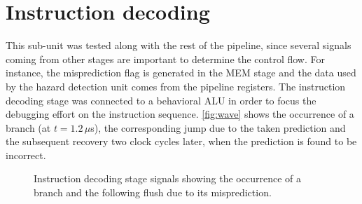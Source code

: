 \section{Instruction decoding}
This sub-unit was tested along with the rest of the pipeline, since several signals coming from other stages are important to determine the control flow. For instance, the misprediction flag is generated in the MEM stage and the data used by the hazard detection unit comes from the pipeline registers. The instruction decoding stage was connected to a behavioral ALU in order to focus the debugging effort on the instruction sequence. \autoref{fig:wave} shows the occurrence of a branch (at $t=1.2\, \mu$s), the corresponding jump due to the taken prediction and the subsequent recovery two clock cycles later, when the prediction is found to be incorrect.

\begin{figure}[htbp]
	\caption{Instruction decoding stage signals showing the occurrence of a branch and the following flush due to its misprediction.}
	\label{fig:wave}
\end{figure}
